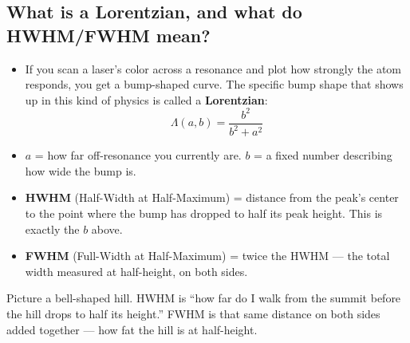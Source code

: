 \documentclass[11pt]{article}
\begin{document}
\subsection*{What is a Lorentzian, and what do HWHM/FWHM mean?}
\begin{itemize}
\item If you scan a laser's color across a resonance and plot how strongly the atom responds, you get a bump-shaped curve. The specific bump shape that shows up in this kind of physics is called a \textbf{Lorentzian}:
\[
\Lambda(a,b) = \frac{b^2}{b^2+a^2}
\]
\item $a$ = how far off-resonance you currently are. $b$ = a fixed number describing how wide the bump is.
\item \textbf{HWHM} (Half-Width at Half-Maximum) = distance from the peak's center to the point where the bump has dropped to half its peak height. This is exactly the $b$ above.
\item \textbf{FWHM} (Full-Width at Half-Maximum) = twice the HWHM --- the total width measured at half-height, on both sides.
\end{itemize}
\begin{plain}
Picture a bell-shaped hill. HWHM is ``how far do I walk from the summit before the hill drops to half its height.'' FWHM is that same distance on both sides added together --- how fat the hill is at half-height.
\end{plain}
\end{document}
